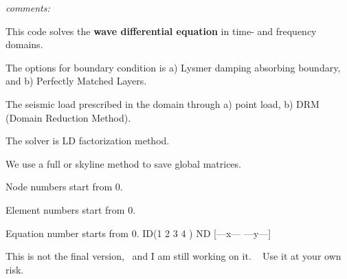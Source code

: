 {\itshape comments\+:}
\begin{DoxyItemize}
\item This code solves the {\bfseries{wave differential equation}} in time-\/ and frequency domains.
\item The options for boundary condition is a) Lysmer damping absorbing boundary, and b) Perfectly Matched Layers.
\item The seismic load prescribed in the domain through a) point load, b) D\+RM (Domain Reduction Method).
\item The solver is LD factorization method.
\item We use a full or skyline method to save global matrices.
\item Node numbers start from 0.
\item Element numbers start from 0.
\item Equation number starts from 0. ID(1 2 3 4 ) ND \mbox{[}---x--- ---y---\mbox{]}
\end{DoxyItemize}This is not the final version,~\newline
 and I am still working on it. ~\newline
 Use it at your own risk. 